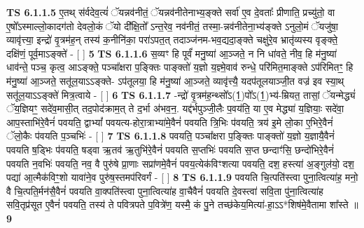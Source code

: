 \documentclass[17pt]{extarticle}
\begin{document}
                  \newline
                                \textbf{ TS 6.1.1.5} \newline
                  ए॒तथ् स॑र्वदेव॒त्यं॑ ॅयन्नव॑नीतं॒ ॅयन्नव॑नीतेनाभ्य॒ङ्क्ते सर्वा॑ ए॒व दे॒वताः᳚ प्रीणाति॒ प्रच्यु॑तो॒ वा ए॒षो᳚ऽस्माल्लो॒कादग॑तो देवलो॒कं ॅयो दी᳚क्षि॒तो᳚ ऽन्त॒रेव॒ नव॑नीतं॒ तस्मा॒-न्नव॑नीतेना॒भ्य॑ङ्क्ते ऽनुलो॒मं ॅयजु॑षा॒ व्यावृ॑त्त्या॒ इन्द्रो॑ वृ॒त्रम॑ह॒न् तस्य॑ क॒नीनि॑का॒ परा॑ऽपत॒त् तदाञ्ज॑नम-भव॒द्यदा॒ङ्क्ते चक्षु॑रे॒व भ्रातृ॑व्यस्य वृङ्क्ते॒ दक्षि॑णं॒ पूर्व॒माऽङ्क्ते॑ - [  ] \textbf{  5} \newline
                  \newline
                                \textbf{ TS 6.1.1.6} \newline
                  स॒व्यꣳ हि पूर्वं॑ मनु॒ष्या॑ आ॒ञ्जते॒ न नि धा॑वते॒ नीव॒ हि म॑नु॒ष्या॑ धाव॑न्ते॒ पञ्च॒ कृत्व॒ आऽङ्क्ते॒ पञ्चा᳚क्षरा प॒ङ्क्तिः पाङ्क्तो॑ य॒ज्ञो य॒ज्ञ्मे॒वाव॑ रुन्धे॒ परि॑मित॒माङ्क्ते ऽप॑रिमितꣳ॒॒ हि म॑नु॒ष्या॑ आ॒ञ्जते॒ सतू॑ल॒याऽऽङ्क्ते- ऽप॑तूलया॒ हि म॑नु॒ष्या॑ आ॒ञ्जते॒ व्यावृ॑त्त्यै॒ यदप॑तूलयाञ्जी॒त वज्र॑ इव स्या॒थ् सतू॑ल॒याऽऽङ्क्ते॑ मित्र॒त्वाये - [  ] \textbf{  6} \newline
                  \newline
                                \textbf{ TS 6.1.1.7} \newline
                  -न्द्रो॑ वृ॒त्रम॑ह॒न्थ्सो᳚ऽ(1॒)पो᳚ऽ(1॒)भ्य॑-म्रियत॒ तासां॒ ॅयन्मेद्ध्यं॑ ॅय॒ज्ञियꣳ॒॒ सदे॑व॒मासी॒त् तद॒पोद॑क्राम॒त् ते द॒र्भा अ॑भव॒न॒. यद्द॑र्भपुञ्जी॒लैः प॒वय॑ति॒ या ए॒व मेद्ध्या॑ य॒ज्ञियाः॒ सदे॑वा॒ आप॒स्ताभि॑रे॒वैनं॑ पवयति॒ द्वाभ्यां᳚ पवयत्य-होरा॒त्राभ्या॑मे॒वैनं॑ पवयति त्रि॒भिः प॑वयति॒ त्रय॑ इ॒मे लो॒का ए॒भिरे॒वैनं॑ ॅलो॒कैः प॑वयति प॒ञ्चभिः॑ - [  ] \textbf{  7} \newline
                  \newline
                                \textbf{ TS 6.1.1.8} \newline
                  पवयति॒ पञ्चा᳚क्षरा प॒ङ्क्तिः पाङ्क्तो॑ य॒ज्ञो य॒ज्ञायै॒वैनं॑ पवयति ष॒ड्भिः प॑वयति॒ षड्वा ऋ॒तव॑ ऋ॒तुभि॑रे॒वैनं॑ पवयति स॒प्तभिः॑ पवयति स॒प्त छन्दाꣳ॑सि॒ छन्दो॑भिरे॒वैनं॑ पवयति न॒वभिः॑ पवयति॒ नव॒ वै पुरु॑षे प्रा॒णाः सप्रा॑णमे॒वैनं॑ पवय॒त्येक॑विꣳशत्या पवयति॒ दश॒ हस्त्या॑ अ॒ङ्गुल॑यो॒ दश॒ पद्या॑ आ॒त्मैक॑विꣳ॒॒शो यावा॑ने॒व पुरु॑ष॒स्तमप॑रिवर्गं - [  ] \textbf{  8} \newline
                  \newline
                                \textbf{ TS 6.1.1.9} \newline
                  पवयति चि॒त्पति॑स्त्वा पुना॒त्वित्या॑ह॒ मनो॒ वै चि॒त्पति॒र्मन॑सै॒वैनं॑ पवयति वा॒क्पति॑स्त्वा पुना॒त्वित्या॑ह वा॒चैवैनं॑ पवयति दे॒वस्त्वा॑ सवि॒ता पु॑ना॒त्वित्या॑ह सवि॒तृप्र॑सूत ए॒वैनं॑ पवयति॒ तस्य॑ ते पवित्रपते प॒वित्रे॑ण॒ यस्मै॒ कं पु॒ने तच्छ॑केय॒मित्या॑-हा॒ऽऽ*शिष॑मे॒वैतामा शा᳚स्ते ॥ \textbf{  9} \newline
\end{document}
